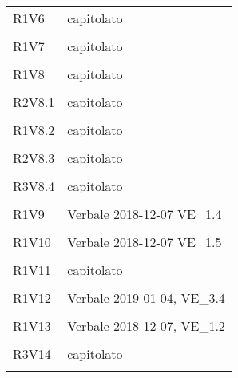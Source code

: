 \begin{longtable}{ >{\centering}p{}
		>{\centering}p{}}
	R1V6 & capitolato\\\tabularnewline
	
	R1V7 & capitolato\\\tabularnewline
	
	R1V8 & capitolato\\\tabularnewline
	
	R2V8.1 & capitolato\\\tabularnewline
	
	R1V8.2 & capitolato\\\tabularnewline
	
	R2V8.3 & capitolato\\\tabularnewline
	
	R3V8.4 & capitolato\\\tabularnewline
	
	R1V9 & Verbale 2018-12-07  VE\_1.4\\\tabularnewline
	
	R1V10 & Verbale 2018-12-07  VE\_1.5\\\tabularnewline
	
	R1V11 & capitolato\\\tabularnewline
	
	R1V12 & Verbale 2019-01-04, VE\_3.4\\\tabularnewline
	
	R1V13 & Verbale 2018-12-07, VE\_1.2\\\tabularnewline
	
	R3V14 & capitolato\\\tabularnewline
	
	
\end{longtable}
